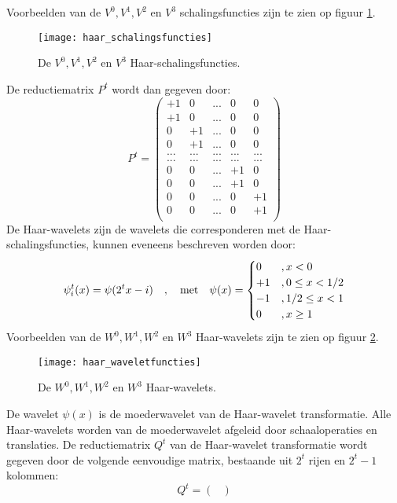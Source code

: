 \begin{enumerate}
{\begin{itemize}
		Voorbeelden van de $V^0, V^1, V^2$ en $V^3$ schalingsfuncties zijn te zien op figuur \ref{fig:haar_schalingsfuncties}.
		\begin{figure}[ht]
			\centering
			\texttt{[image: haar\_schalingsfuncties]}
			\caption{De $V^0, V^1, V^2$ en $V^3$ Haar-schalingsfuncties.}
			\label{fig:haar_schalingsfuncties}
		\end{figure}
		De reductiematrix $P^t$ wordt dan gegeven door:
		$$
		P^t = 
		\begin{pmatrix}
			+1 & 0 & ... & 0 & 0 \\
			+1 & 0 & ... & 0 & 0 \\
			0 & +1 &  ... & 0 & 0 \\
			0 & +1 &  ... & 0 & 0 \\
			... & ... & ... & ... & ... \\
			... & ... & ... & ... & ... \\
		 	0 & 0 & ... & +1 & 0  \\
		 	0 & 0 & ... & +1 & 0  \\
		 	0 & 0 & ... & 0 & +1  \\
		 	0 & 0 & ... & 0 & +1  \\
		\end{pmatrix}
		$$
		De Haar-wavelets zijn de wavelets die corresponderen met de Haar-schalingsfuncties, kunnen eveneens beschreven worden door:
		$$\psi_i^t(x) = \psi(2^tx - i)\quad,\quad\hbox{met}\quad \psi(x) = \begin{cases}
			0 &, x < 0 \\
			+ 1 &, 0 \leq x < 1/2 \\
			-1 &, 1/2 \leq x < 1 \\
			0 &, x \geq 1
		\end{cases}$$
		Voorbeelden van de $W^0, W^1, W^2$ en $W^3$ Haar-wavelets zijn te zien op figuur \ref{fig:haar_waveletfuncties}.
		\begin{figure}[ht]
			\centering
			\texttt{[image: haar\_waveletfuncties]}
			\caption{De $W^0, W^1, W^2$ en $W^3$ Haar-wavelets.}
			\label{fig:haar_waveletfuncties}
		\end{figure}
		De wavelet $\psi(x)$ is de moederwavelet van de Haar-wavelet transformatie. Alle Haar-wavelets worden van de moederwavelet afgeleid door schaaloperaties en translaties. De reductiematrix $Q^t$ van de Haar-wavelet transformatie wordt gegeven door de volgende eenvoudige matrix, bestaande uit $2^t$ rijen en $2^t - 1$ kolommen:
		$$
		Q^t =
		\begin{pmatrix}

\end{pmatrix}$$
\end{itemize}}
\end{enumerate}
